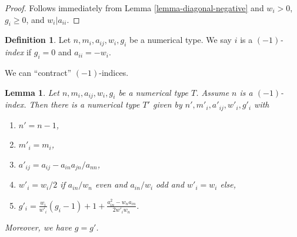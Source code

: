 \documentclass[10pt,a4paper]{amsart}
\theoremstyle{plain}
\newtheorem{lemma}[subsection]{Lemma}
\theoremstyle{definition}
\newtheorem{definition}[subsection]{Definition}
\theoremstyle{remark}
\numberwithin{equation}{subsection}
\begin{document}
\begin{proof}
Follows immediately from Lemma \ref{lemma-diagonal-negative} and
$w_i > 0$, $g_i \geq 0$, and $w_i | a_{ii}$.
\end{proof}

\begin{definition}
\label{definition-type-minus-one}
Let $n, m_i, a_{ij}, w_i, g_i$ be a numerical type.
We say $i$ is a {\it $(-1)$-index} if $g_i = 0$ and $a_{ii} = -w_i$.
\end{definition}

\noindent
We can ``contract'' $(-1)$-indices.

\begin{lemma}
\label{lemma-contract}
Let $n, m_i, a_{ij}, w_i, g_i$ be a numerical type $T$.
Assume $n$ is a $(-1)$-index. Then there is a numerical
type $T'$ given by $n', m'_i, a'_{ij}, w'_i, g'_i$ with
\begin{enumerate}
\item $n' = n - 1$,
\item $m'_i = m_i$,
\item $a'_{ij} = a_{ij} - a_{in}a_{jn}/a_{nn}$,
\item $w'_i = w_i/2$ if $a_{in}/w_n$ even and $a_{in}/w_i$ odd
and $w'_i = w_i$ else,
\item $g'_i =
\frac{w_i}{w'_i}(g_i - 1) + 1 + \frac{a_{in}^2 - w_na_{in}}{2w'_iw_n}$.
\end{enumerate}
Moreover, we have $g = g'$.
\end{lemma}
\end{document}
